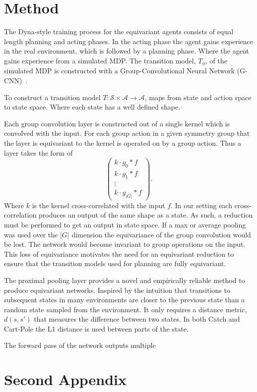 \documentclass[mlabstract]{jmlr}
\begin{document}
\section{Method}
The Dyna-style training process for the equivariant agents consists of equal length planning and acting phases. In the acting phase the agent gains experience in the real environment, which is followed by a planning phase. Where the agent gains experience from a simulated MDP. The transition model, $T_\phi$, of the simulated MDP is constructed with a Group-Convolutional Neural Network (G-CNN)~\cite{cohen2016group}. 

To construct a transition model $T: \mathcal{S} \times \mathcal{A} \rightarrow \mathcal{A}$, maps from state and action space to state space. Where each state has a well defined shape.

Each group convolution layer is constructed out of a single kernel which is convolved with the input. For each group action in a given symmetry group that the layer is equivariant to the kernel is operated on by a group action. Thus a layer takes the form of
\begin{equation}
  \begin{pmatrix}
     k \cdot g_0* f \\
     k \cdot g_1 * f\\
     \vdots \\
     k \cdot g_{|G|} * f
  \end{pmatrix}.
  \label{eq:g-cnn}
\end{equation}
Where $k$ is the kernel cross-correlated with the input $f$. In our setting each cross-correlation produces an output of the same shape as a state. As such, a reduction must be performed to get an output in state space. If a max or average pooling was used over the $|G|$ dimension the equivariance of the group convolution would be lost. The network would become invariant to group operations on the input. This loss of equivariance motivates the need for an equivariant reduction to ensure that the transition models used for planning are fully equivariant.

The proximal pooling layer provides a novel and empirically reliable method to produce equivariant networks. Inspired by the intuition that transitions to subsequent states in many environments are closer to the previous state than a random state sampled from the environment. It only requires a distance metric, $d(s, s')$ that measures the difference between two states. In both Catch and Cart-Pole the L1 distance is used between parts of the state.

The forward pass of the network outputs multiple 



\label{sec:intro}




\appendix


\section{Second Appendix}\label{apd:second}
\end{document}
